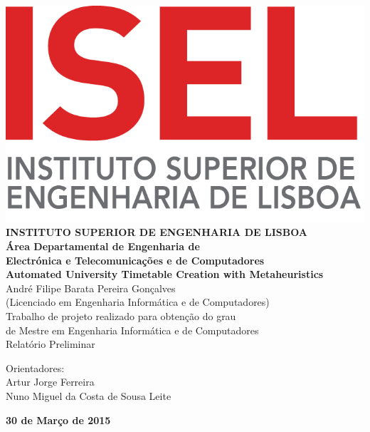 \begin{titlepage}
	\thispagestyle{empty}
	\begin{center}
		\includegraphics[width=6.1 cm]{./images/isel_logo.png} \\[0.5cm]
		{\Large \textbf{INSTITUTO SUPERIOR DE ENGENHARIA DE LISBOA}} \\[0.5cm]
		{\Large \textbf{Área Departamental de Engenharia de \\Electrónica e Telecomunica\c cões e de Computadores}} \\[0.8cm]		
		\fontsize{18pt}{10pt}\selectfont
		{\textbf{Automated University Timetable Creation with Metaheuristics}} \\[0.8cm]
		\fontsize{16pt}{10pt}\selectfont
		André Filipe Barata Pereira Gonçalves\\[0.2cm]
		\fontsize{14pt}{10pt}\selectfont
		(Licenciado em Engenharia Informática e de Computadores)\\[0.8cm]
		\fontsize{12pt}{10pt}\selectfont
		{Trabalho de projeto realizado para obten\c cão do grau\\de Mestre em Engenharia Informática e de Computadores} \\[0.8cm]
		\fontsize{14pt}{10pt}\selectfont
		Relatório Preliminar\\[0.8cm]
		\fontsize{12pt}{10pt}\selectfont
		\vfill
		\begin{tabbing}
		   \fontsize{12pt}{10pt}\selectfont
		   Orientadores: \\
		   \fontsize{11pt}{10pt}\selectfont
		   \hspace{1.1cm}Artur Jorge Ferreira \\
		   \fontsize{11pt}{10pt}\selectfont
		   \hspace{1.1cm}Nuno Miguel da Costa de Sousa Leite \\
		\end{tabbing}
		
		
		\fontsize{10pt}{10pt}\selectfont
		\textbf{30 de Março de 2015}
	\end{center}
\end{titlepage}
